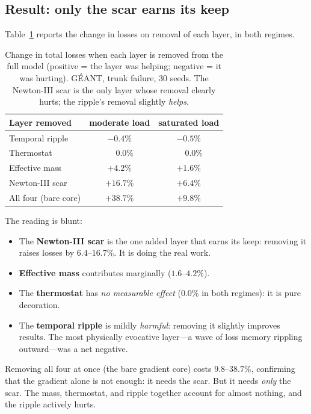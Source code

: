 \subsection{Result: only the scar earns its keep}

Table~\ref{tab:ablation} reports the change in losses on removal of each layer,
in both regimes.

\begin{table}[t]
\centering
\caption{Change in total losses when each layer is removed from the full model
(positive = the layer was helping; negative = it was hurting). G\'EANT, trunk
failure, 30 seeds. The Newton-III scar is the only layer whose removal clearly
hurts; the ripple's removal slightly \emph{helps}.}
\label{tab:ablation}
\small
\begin{tabular}{lcc}
\toprule
Layer removed & moderate load & saturated load \\
\midrule
Temporal ripple   & $-0.4\%$ & $-0.5\%$ \\
Thermostat        & $\phantom{+}0.0\%$ & $\phantom{+}0.0\%$ \\
Effective mass    & $+4.2\%$ & $+1.6\%$ \\
Newton-III scar   & $+16.7\%$ & $+6.4\%$ \\
\midrule
All four (bare core) & $+38.7\%$ & $+9.8\%$ \\
\bottomrule
\end{tabular}
\end{table}

The reading is blunt:

\begin{itemize}
\item The \textbf{Newton-III scar} is the one added layer that earns its keep:
removing it raises losses by $6.4$--$16.7\%$. It is doing the real work.
\item \textbf{Effective mass} contributes marginally ($1.6$--$4.2\%$).
\item The \textbf{thermostat} has \emph{no measurable effect} (0.0\% in both
regimes): it is pure decoration.
\item The \textbf{temporal ripple} is mildly \emph{harmful}: removing it
slightly improves results. The most physically evocative layer---a wave of loss
memory rippling outward---was a net negative.
\end{itemize}

Removing all four at once (the bare gradient core) costs $9.8$--$38.7\%$,
confirming that the gradient alone is not enough: it needs the scar. But it
needs \emph{only} the scar. The mass, thermostat, and ripple together account
for almost nothing, and the ripple actively hurts.

